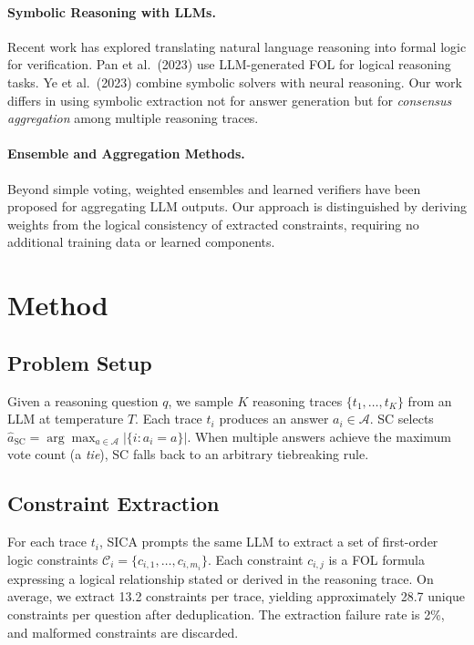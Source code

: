 \documentclass[11pt,a4paper]{article}
\begin{document}
\paragraph{Symbolic Reasoning with LLMs.}
Recent work has explored translating natural language reasoning into formal logic for verification.
Pan et al.\ (2023) use LLM-generated FOL for logical reasoning tasks.
Ye et al.\ (2023) combine symbolic solvers with neural reasoning.
Our work differs in using symbolic extraction not for answer generation but for \emph{consensus aggregation} among multiple reasoning traces.

\paragraph{Ensemble and Aggregation Methods.}
Beyond simple voting, weighted ensembles and learned verifiers have been proposed for aggregating LLM outputs.
Our approach is distinguished by deriving weights from the logical consistency of extracted constraints, requiring no additional training data or learned components.


\section{Method}
\label{sec:method}

\subsection{Problem Setup}

Given a reasoning question $q$, we sample $K$ reasoning traces $\{t_1, \ldots, t_K\}$ from an LLM at temperature $T$.
Each trace $t_i$ produces an answer $a_i \in \mathcal{A}$.
SC selects $\hat{a}_{\text{SC}} = \arg\max_{a \in \mathcal{A}} |\{i : a_i = a\}|$.
When multiple answers achieve the maximum vote count (a \emph{tie}), SC falls back to an arbitrary tiebreaking rule.

\subsection{Constraint Extraction}

For each trace $t_i$, SICA prompts the same LLM to extract a set of first-order logic constraints $\mathcal{C}_i = \{c_{i,1}, \ldots, c_{i,m_i}\}$.
Each constraint $c_{i,j}$ is a FOL formula expressing a logical relationship stated or derived in the reasoning trace.
On average, we extract 13.2 constraints per trace, yielding approximately 28.7 unique constraints per question after deduplication.
The extraction failure rate is 2\%, and malformed constraints are discarded.
\end{document}
